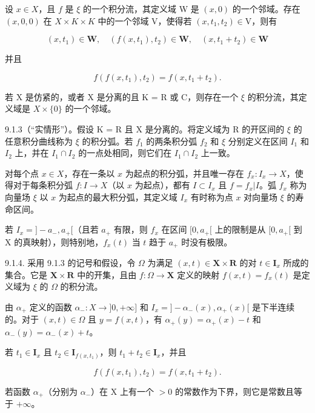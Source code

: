 设 \(x\in X\)，且 \(f\) 是 \(\xi\) 的一个积分流，其定义域 W 是 \((x,0)\) 的一个邻域。存在 \((x,0,0)\) 在 \(X \times K \times K\) 中的一个邻域 V，使得若 \((x,t_{1},t_{2})\in\mathrm{V}\)，则有

\[
(x, t _ {1}) \in \mathbf {W}, \quad (f (x, t _ {1}), t _ {2}) \in \mathbf {W}, \quad (x, t _ {1} + t _ {2}) \in \mathbf {W}
\]

并且

\[
f (f (x, t _ {1}), t _ {2}) = f (x, t _ {1} + t _ {2}).\tag{2}
\]

若 X 是仿紧的，或者 X 是分离的且 K = R 或 C，则存在一个 \(\xi\) 的积分流，其定义域是 \(X \times \{0\}\) 的一个邻域。

9.1.3（“实情形”）。假设 K = R 且 X 是分离的。将定义域为 R 的开区间的 \(\xi\) 的任意积分曲线称为 \(\xi\) 的积分弧。若 \(f_{1}\) 的两条积分弧 \(f_{2}\) 和 \(\xi\) 分别定义在区间 \(I_{1}\) 和 \(I_{2}\) 上，并在 \(I_{1} \cap I_{2}\) 的一点处相同，则它们在 \(I_{1} \cap I_{2}\) 上一致。

对每个点 \(x \in X\)，存在一条以 \(x\) 为起点的积分弧，并且唯一存在 \(f_x: I_x \to X\)，使得对于每条积分弧 \(f: I \to X\)（以 \(x\) 为起点），都有 \(I \subset I_x\) 且 \(f = f_x|I\)。弧 \(f_x\) 称为向量场 \(\xi\) 以 \(x\) 为起点的最大积分弧，其定义域 \(I_x\) 有时称为点 \(x\) 对向量场 \(\xi\) 的寿命区间。

若 \(I_x = ]-a_-,a_+[\)（且若 \(a_+\) 有限，则 \(f_x\) 在区间 \([0,a_+[\) 上的限制是从 \([0,a_+[\) 到 X 的真映射），则特别地，\(f_x(t)\) 当 \(t\) 趋于 \(a_+\) 时没有极限。

9.1.4. 采用 9.1.3 的记号和假设，令 \(\Omega\) 为满足 \((x,t)\in\mathbf{X}\times\mathbf{R}\) 的对 \(t\in\mathbf{I}_{x}\) 所成的集合。它是 \(\mathbf{X}\times\mathbf{R}\) 中的开集，且由 \(f\colon\Omega\to\mathbf{X}\) 定义的映射 \(f(x,t)=f_{x}(t)\) 是定义域为 \(\xi\) 的 \(\Omega\) 的积分流。

由 \(\alpha_{+}\) 定义的函数 \(\alpha_{-}: X \to ]0,+\infty]\) 和 \(I_{x} = ]-\alpha_{-}(x),\alpha_{+}(x)[\) 是下半连续的。对于 \((x, t) \in \Omega\) 且 \(y = f(x, t)\)，有 \(\alpha_{+}(y) = \alpha_{+}(x) - t\) 和 \(\alpha_{-}(y) = \alpha_{-}(x) + t\)。

若 \(t_1 \in \mathbf{I}_x\) 且 \(t_2 \in \mathbf{I}_{f(x, t_1)}\)，则 \(t_1 + t_2 \in \mathbf{I}_x\)，并且

\[
f (f (x, t _ {1}), t _ {2}) = f (x, t _ {1} + t _ {2}).\tag{3}
\]

若函数 \(\alpha_{+}\)（分别为 \(\alpha_{-}\)）在 X 上有一个 \(>0\) 的常数作为下界，则它是常数且等于 \(+\infty\)。

